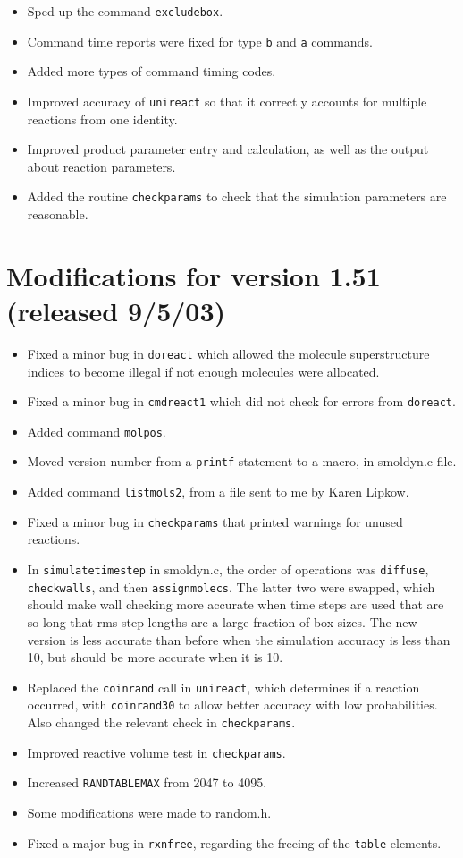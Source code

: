 \documentclass {scrbook}
\newcommand {\ttt} {\texttt}
\begin{document}
\begin{itemize}
\item Sped up the command \ttt{excludebox}.
\item Command time reports were fixed for type \ttt{b} and \ttt{a} commands.
\item Added more types of command timing codes.
\item Improved accuracy of \ttt{unireact} so that it correctly accounts for multiple reactions from one identity.
\item Improved product parameter entry and calculation, as well as the output about reaction parameters.
\item Added the routine \ttt{checkparams} to check that the simulation parameters are reasonable.
\end{itemize}

\section{Modifications for version 1.51 (released 9/5/03)}
\begin{itemize}
\item Fixed a minor bug in \ttt{doreact} which allowed the molecule superstructure indices to become illegal if not enough molecules were allocated.
\item Fixed a minor bug in \ttt{cmdreact1} which did not check for errors from \ttt{doreact}.
\item Added command \ttt{molpos}.
\item Moved version number from a \ttt{printf} statement to a macro, in smoldyn.c file.
\item Added command \ttt{listmols2}, from a file sent to me by Karen Lipkow.
\item Fixed a minor bug in \ttt{checkparams} that printed warnings for unused reactions.
\item In \ttt{simulatetimestep} in smoldyn.c, the order of operations was \ttt{diffuse}, \ttt{checkwalls}, and then \ttt{assignmolecs}. The latter two were swapped, which should make wall checking more accurate when time steps are used that are so long that rms step lengths are a large fraction of box sizes. The new version is less accurate than before when the simulation accuracy is less than 10, but should be more accurate when it is 10.
\item Replaced the \ttt{coinrand} call in \ttt{unireact}, which determines if a reaction occurred, with \ttt{coinrand30} to allow better accuracy with low probabilities. Also changed the relevant check in \ttt{checkparams}.
\item Improved reactive volume test in \ttt{checkparams}.
\item Increased \ttt{RANDTABLEMAX} from 2047 to 4095.
\item Some modifications were made to random.h.
\item Fixed a major bug in \ttt{rxnfree}, regarding the freeing of the \ttt{table} elements.
\end{itemize}
\end{document}
